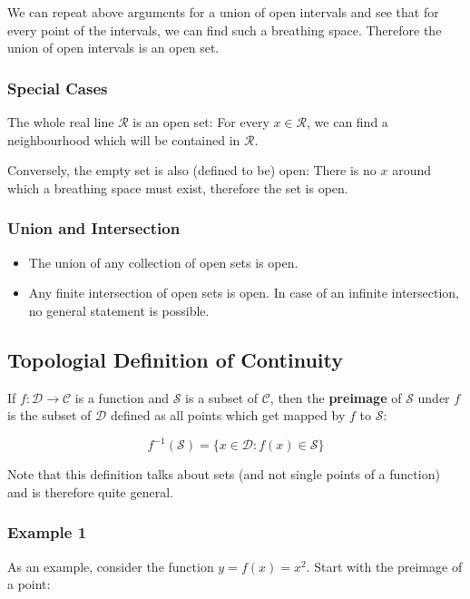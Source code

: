 We can repeat above arguments for a union of open intervals and see that
for every point of the intervals, we can find such a breathing space.
Therefore the union of open intervals is an open set.

\subsubsection{Special Cases}

The whole real line \(\mathcal{R}\) is an open set: For every
\(x \in \mathcal{R}\), we can find a neighbourhood which will be
contained in \(\mathcal{R}\).

Conversely, the empty set is also (defined to be) open: There is no
\(x\) around which a breathing space must exist, therefore the set is
open.

\subsubsection{Union and Intersection}

\begin{itemize}
\item
  The union of any collection of open sets is open.
\item
  Any finite intersection of open sets is open. In case of an infinite
  intersection, no general statement is possible.
\end{itemize}

\subsection{Topologial Definition of Continuity}

If \(f: \mathcal{D} \rightarrow \mathcal{C}\) is a function and
\(\mathcal{S}\) is a subset of \(\mathcal{C}\), then the
\textbf{preimage} of \(\mathcal{S}\) under \(f\) is the subset of
\(\mathcal{D}\) defined as all points which get mapped by \(f\) to
\(\mathcal{S}\):

\[
f^{-1}(\mathcal{S}) = \{x \in \mathcal{D}: f(x) \in \mathcal{S} \}
\]

Note that this definition talks about sets (and not single points of a
function) and is therefore quite general.

\subsubsection{Example 1}

As an example, consider the function \(y = f(x) = x^2\). Start with the preimage of a point:

